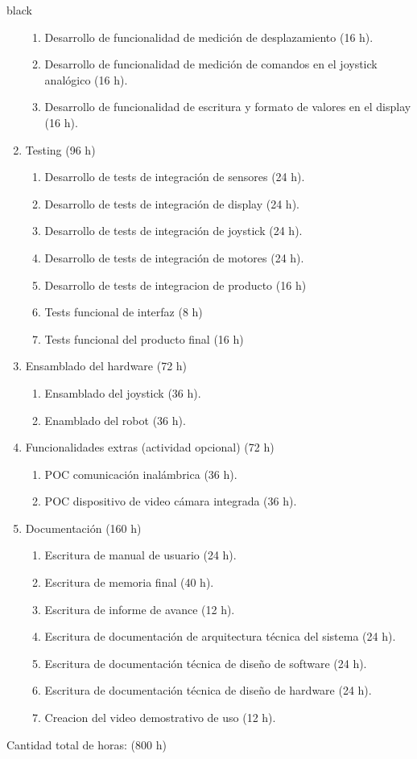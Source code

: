 \documentclass[
11pt, %
]{charter}
\begin{document}
\begin{consigna}{black}
\begin{enumerate}
\begin{enumerate}
	\item Desarrollo de funcionalidad de medición de desplazamiento (16 h).
	\item Desarrollo de funcionalidad de medición de comandos en el joystick analógico (16 h).
	\item Desarrollo de funcionalidad de escritura y formato de valores en el display (16 h).
	\end{enumerate}
\item Testing (96 h)
	\begin{enumerate}
	\item Desarrollo de tests de integración de sensores (24 h).
	\item Desarrollo de tests de integración de display (24 h).
	\item Desarrollo de tests de integración de joystick (24 h).
	\item Desarrollo de tests de integración de motores (24 h).
	\item Desarrollo de tests de integracion de producto (16 h)
	\item Tests funcional de interfaz (8 h)
	\item Tests funcional del producto final (16 h)
	\end{enumerate}
\item Ensamblado del hardware (72 h)
	\begin{enumerate}
	\item Ensamblado del joystick (36 h).
	\item Enamblado del robot (36 h).
	\end{enumerate}
\item Funcionalidades extras (actividad opcional) (72 h)
	\begin{enumerate}
	\item POC comunicación inalámbrica (36 h).
	\item POC dispositivo de video cámara integrada (36 h).
	\end{enumerate}
\item Documentación (160 h)
	\begin{enumerate}				
	\item Escritura de manual de usuario (24 h).			
	\item Escritura de memoria final (40 h).
	\item Escritura de informe de avance (12 h).
	\item Escritura de documentación de arquitectura técnica del sistema (24 h).
	\item Escritura de documentación técnica de diseño de software (24 h).
	\item Escritura de documentación técnica de diseño de hardware (24 h).		
	\item Creacion del video demostrativo de uso (12 h).				
	\end{enumerate}	
\end{enumerate}

Cantidad total de horas: (800 h)

\end{consigna}
\end{document}
